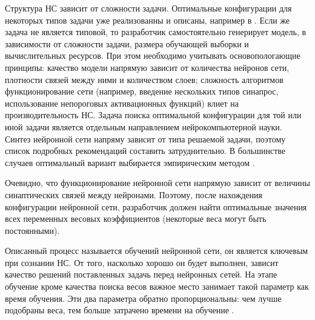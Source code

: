 \documentclass[a4paper,english,russian]{G2-105}
\begin{document}
\par Структура НС зависит от сложности задачи. Оптимальные конфигурации для некоторых типов задачи уже реализованны и описаны, например в \cite{5}. Если же задача не является типовой, то разработчик самостоятельно генерирует модель, в зависимости от сложности задачи, размера обучающей выборки и вычислительных ресурсов. При этом необходимо учитывать основопологающие принципы: качество модели напрямую зависит от количества нейронов сети, плотности связей между ними и количеством слоев; сложность алгоритмов функционирование сети (например, введение нескольких типов синапрос, использование непороговых активационных функций) влиет на производительность НС. Задача поиска оптимальной конфигурации для той или иной задачи является отдельным направлением нейрокомпьютерной науки. Синтез нейронной сети напряму зависит от типа решаемой задачи, поэтому список подробных рекомендаций составить затруднительно. В большинстве случаев оптимальный вариант выбирается эмпирическим методом \cite{6}.
\par Очевидно, что функционирование нейронной сети напрямую зависит от величины синаптических связей между нейронами. Поэтому, после нахождения конфигурации нейронной сети, разработчик должен найти оптимальные значения всех переменных весовых коэффициентов (некоторые веса могут быть постоянными).
\par Описанный процесс называется обучений нейронной сети, он является ключевым при сознании НС. От того, насколько хорошо он будет выполнен, зависит качество решений поставленных задачь перед нейронных сетей. На этапе обучение кроме качества поиска весов важное место занимает такой параметр как время обучения. Эти два параметра обратно пропорциональны: чем лучше подобраны веса, тем больше затрачено времени на обучение \cite{7}.
\end{document}
